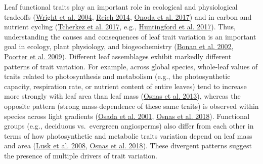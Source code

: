 \documentclass[
  12pt,
  letterpaper,
  DIV=11,
  numbers=noendperiod]{scrartcl}
\begin{document}
Leaf functional traits play an important role in ecological and
physiological tradeoffs (\protect\hyperlink{ref-Wright2004a}{Wright et
al. 2004}, \protect\hyperlink{ref-Reich2014}{Reich 2014},
\protect\hyperlink{ref-Onoda2017}{Onoda et al. 2017}) and in carbon and
nutrient cycling (\protect\hyperlink{ref-Tcherkez2017}{Tcherkez et al.
2017}, e.g., \protect\hyperlink{ref-Huntingford2017}{Huntingford et al.
2017}). Thus, understanding the causes and consequences of leaf trait
variation is an important goal in ecology, plant physiology, and
biogeochemistry (\protect\hyperlink{ref-Bonan2002}{Bonan et al. 2002},
\protect\hyperlink{ref-Poorter2009}{Poorter et al. 2009}). Different
leaf assemblages exhibit markedly different patterns of trait variation.
For example, across global species, whole-leaf values of traits related
to photosynthesis and metabolism (e.g., the photosynthetic capacity,
respiration rate, or nutrient content of entire leaves) tend to increase
more strongly with leaf area than leaf mass
(\protect\hyperlink{ref-Osnas2013}{Osnas et al. 2013}), whereas the
opposite pattern (strong mass-dependence of these same traits) is
observed within species across light gradients
(\protect\hyperlink{ref-Osada2001}{Osada et al. 2001},
\protect\hyperlink{ref-Osnas2018}{Osnas et al. 2018}). Functional groups
(e.g., deciduous vs.~evergreen angiosperms) also differ from each other
in terms of how photosynthetic and metabolic traits variation depend on
leaf mass and area (\protect\hyperlink{ref-Lusk2008}{Lusk et al. 2008},
\protect\hyperlink{ref-Osnas2018}{Osnas et al. 2018}). These divergent
patterns suggest the presence of multiple drivers of trait variation.
\end{document}
